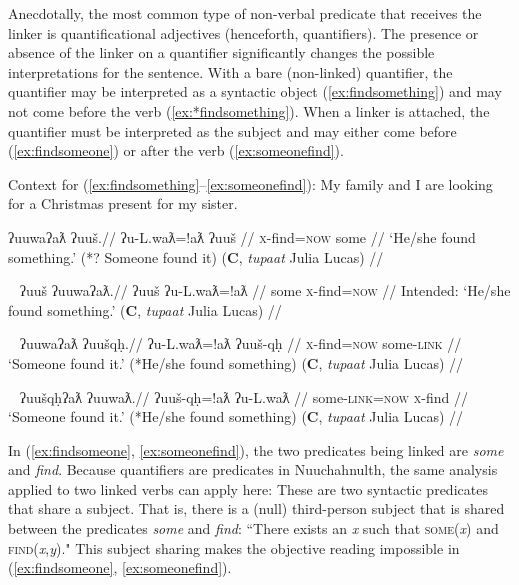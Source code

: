 Anecdotally, the most common type of non-verbal predicate that receives the linker is quantificational adjectives (henceforth, quantifiers). The presence or absence of the linker on a quantifier significantly changes the possible interpretations for the sentence. With a bare (non-linked) quantifier, the quantifier may be interpreted as a syntactic object (\ref{ex:findsomething}) and may not come before the verb (\ref{ex:*findsomething}). When a linker is attached, the quantifier must be interpreted as the subject and may either come before (\ref{ex:findsomeone}) or after the verb (\ref{ex:someonefind}).

\vspace{5pt}

\noindent Context for (\ref{ex:findsomething}--\ref{ex:someonefind}): My family and I are looking for a Christmas present for my sister.

\ex \label{ex:findsomething}
\begingl
\glpreamble ʔuuwaʔaƛ ʔuuš.//
\gla ʔu-L.waƛ=!aƛ ʔuuš //
\glb \textsc{x}-find=\textsc{now} some //
\glft `He/she found something.' (*? Someone found it) (\textbf{C}, \textit{tupaat} Julia Lucas) //
\endgl
\xe

\ex~ \label{ex:*findsomething}
\begingl
\glpreamble *ʔuuš ʔuuwaʔaƛ.//
\gla ʔuuš ʔu-L.waƛ=!aƛ //
\glb some \textsc{x}-find=\textsc{now} //
\glft Intended: `He/she found something.' (\textbf{C}, \textit{tupaat} Julia Lucas) //
\endgl
\xe

\ex~ \label{ex:findsomeone}
\begingl
\glpreamble ʔuuwaʔaƛ ʔuušqḥ.//
\gla ʔu-L.waƛ=!aƛ ʔuuš-qḥ //
\glb \textsc{x}-find=\textsc{now} some-\textsc{link} //
\glft `Someone found it.' (*He/she found something) (\textbf{C}, \textit{tupaat} Julia Lucas) //
\endgl
\xe

\ex~ \label{ex:someonefind}
\begingl
\glpreamble ʔuušqḥʔaƛ ʔuuwaƛ.//
\gla ʔuuš-qḥ=!aƛ ʔu-L.waƛ //
\glb some-\textsc{link}=\textsc{now} \textsc{x}-find //
\glft `Someone found it.' (*He/she found something) (\textbf{C}, \textit{tupaat} Julia Lucas) //
\endgl
\xe

\begin{comment}
\ex \label{ex:someonefind2}
\begingl
\glpreamble ʔuušqḥ ʔuuwaʔaƛ.//
\gla ʔuuš-qḥ ʔu-L.waƛ=!aƛ //
\glb some-\textsc{link} \textsc{x}-find=\textsc{now} //
\glft `Someone found it.' (*He/she found something) //
\endgl
\xe
\end{comment}

In (\ref{ex:findsomeone}, \ref{ex:someonefind}), the two predicates being linked are \textit{some} and \textit{find}. Because quantifiers are predicates in Nuuchahnulth, the same analysis applied to two linked verbs can apply here: These are two syntactic predicates that share a subject. That is, there is a (null) third-person subject that is shared between the predicates \textit{some} and \textit{find}: ``There exists an \textit{x} such that \textsc{some}(\textit{x}) and \textsc{find}(\textit{x},\textit{y})." This subject sharing makes the objective reading impossible in (\ref{ex:findsomeone}, \ref{ex:someonefind}).

